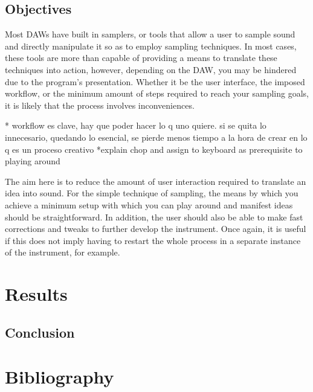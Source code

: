 \documentclass[12pt , a4paper]{article}
\begin{document}
	\subsection{Objectives}
	Most DAWs have built in samplers, or tools that allow a user to sample sound and directly manipulate it so as to employ sampling techniques. In most cases, these tools are more than capable of providing a means to translate these techniques into action, however, depending on the DAW, you may be hindered due to the program's presentation. Whether it be the user interface, the imposed workflow, or the minimum amount of steps required to reach your sampling goals, it is likely that the process involves inconveniences. 
	
	* workflow es clave, hay que poder hacer lo q uno quiere. si se quita lo innecesario, quedando lo esencial, se pierde menos tiempo a la hora de crear en lo q es un proceso creativo
	*explain chop and assign to keyboard as prerequisite to playing around
	
	The aim here is to reduce the amount of user interaction required to translate an idea into sound. For the simple technique of sampling, the means by which you achieve a minimum setup with which you can play around and manifest ideas should be straightforward. In addition, the user should also be able to make fast corrections and tweaks to further develop the instrument. Once again, it is useful if this does not imply having to restart the whole process in a separate instance of the instrument, for example.
	
	\newpage
	\section{Results}
	\subsection{Conclusion}
	 
	\newpage
	\section{Bibliography}
	
\end{document}
